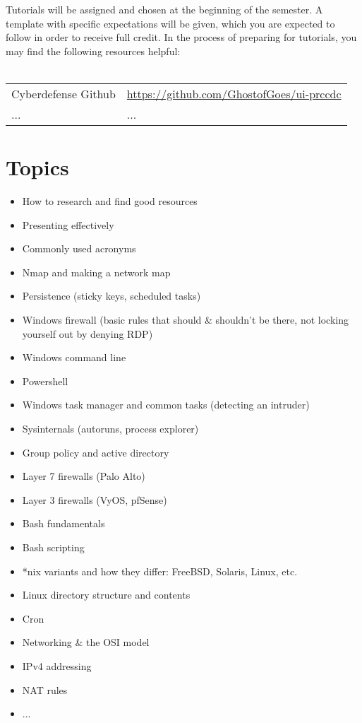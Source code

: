 \documentclass{article}
\begin{document}
\noindent Tutorials will be assigned and chosen at the beginning of the semester. A template with specific expectations will be given, which you are expected to follow in order to receive full credit. In the process of preparing for tutorials, you may find the following resources helpful: \\\\
\begin{tabular}{l  l}
Cyberdefense Github & \url{https://github.com/GhostofGoes/ui-prccdc} \\
... & ...\\
\end{tabular}


\section*{Topics}
	\begin{itemize}
	\item How to research and find good resources
	\item Presenting effectively
	\item Commonly used acronyms
	\item Nmap and making a network map
	\item Persistence (sticky keys, scheduled tasks)
	\item Windows firewall (basic rules that should \& shouldn't be there, not locking yourself out by denying RDP)
	\item Windows command line
	\item Powershell
	\item Windows task manager and common tasks (detecting an intruder)
	\item Sysinternals (autoruns, process explorer)
	\item Group policy and active directory
	\item Layer 7 firewalls (Palo Alto)
	\item Layer 3 firewalls (VyOS, pfSense)
	\item Bash fundamentals
	\item Bash scripting
	\item *nix variants and how they differ: FreeBSD, Solaris, Linux, etc.
	\item Linux directory structure and contents
	\item Cron
	\item Networking \& the OSI model
	\item IPv4 addressing
	\item NAT rules
	\item ...
	\end{itemize}
\end{document}
